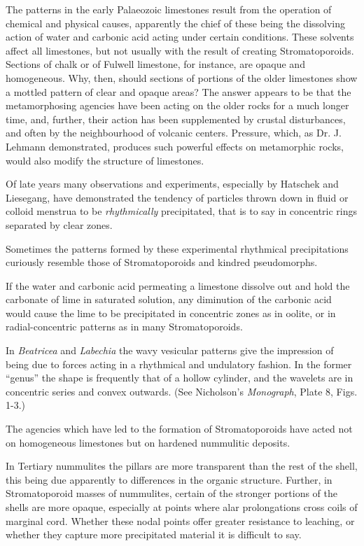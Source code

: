 \documentclass[a4paper, 12pt, oneside]{article}
\begin{document}
The patterns in the early Palaeozoic limestones result from the operation of chemical and physical causes, apparently the chief of these being the dissolving action of water and carbonic acid acting under certain conditions. These solvents affect all limestones, but not usually with the result of creating Stromatoporoids. Sections of chalk or of Fulwell limestone, for instance, are opaque and homogeneous. Why, then, should sections of portions of the older limestones show a mottled pattern of clear and opaque areas? The answer appears to be that the metamorphosing agencies have been acting on the older rocks for a much longer time, and, further, their action has been supplemented by crustal disturbances, and often by the neighbourhood of volcanic centers. Pressure, which, as Dr. J. Lehmann demonstrated, produces such powerful effects on metamorphic rocks, would also modify the structure of limestones.

Of late years many observations and experiments, especially by Hatschek and Liesegang, have demonstrated the tendency of particles thrown down in fluid or colloid menstrua to be \emph{rhythmically} precipitated, that is to say in concentric rings separated by clear zones.

Sometimes the patterns formed by these experimental rhythmical precipitations curiously resemble those of Stromatoporoids and kindred pseudomorphs.

If the water and carbonic acid permeating a limestone dissolve out and hold the carbonate of lime in saturated solution, any diminution of the carbonic acid would cause the lime to be precipitated in concentric zones as in oolite, or in radial-concentric patterns as in many Stromatoporoids.

In \emph{Beatricea} and \emph{Labechia} the wavy vesicular patterns give the impression of being due to forces acting in a rhythmical and undulatory fashion. In the former ``genus'' the shape is frequently that of a hollow cylinder, and the wavelets are in concentric series and convex outwards. (See Nicholson's \emph{Monograph}, Plate 8, Figs. 1-3.)

The agencies which have led to the formation of Stromatoporoids have acted not on homogeneous limestones but on hardened nummulitic deposits.

In Tertiary nummulites the pillars are more transparent than the rest of the shell, this being due apparently to differences in the organic structure. Further, in Stromatoporoid masses of nummulites, certain of the stronger portions of the shells are more opaque, especially at points where alar prolongations cross coils of marginal cord. Whether these nodal points offer greater resistance to leaching, or whether they capture more precipitated material it is difficult to say.
\end{document}

